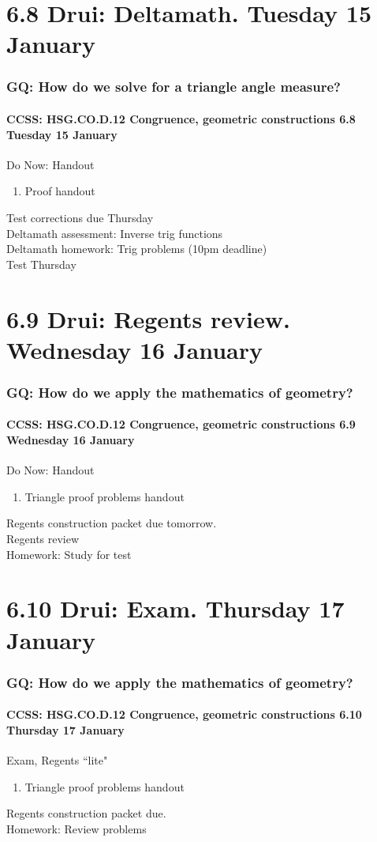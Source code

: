 \documentclass{beamer}
\begin{document}
\section{6.8 Drui: Deltamath. Tuesday 15 January}
  \frame
  {
    \frametitle{GQ: How do we solve for a triangle angle measure?}
    \framesubtitle{CCSS: HSG.CO.D.12 Congruence, geometric constructions  \alert{6.8 Tuesday 15 January}}

    \begin{block}{Do Now: Handout}
      \begin{enumerate}
        \item Proof handout
      \end{enumerate}
    \end{block}
    Test corrections due Thursday\\
    Deltamath assessment: Inverse trig functions\\
    Deltamath homework: Trig problems (10pm deadline)\\
    Test Thursday
  }

\section{6.9 Drui: Regents review. Wednesday 16 January}
  \frame
  {
    \frametitle{GQ: How do we apply the mathematics of geometry?}
    \framesubtitle{CCSS: HSG.CO.D.12 Congruence, geometric constructions  \alert{6.9 Wednesday 16 January}}

    \begin{block}{Do Now: Handout}
      \begin{enumerate}
        \item Triangle proof problems handout
      \end{enumerate}
    \end{block}
    Regents construction packet due tomorrow.\\
    Regents review\\[0.5cm]
    Homework: Study for test
  }

\section{6.10 Drui: Exam. Thursday 17 January}
  \frame
  {
    \frametitle{GQ: How do we apply the mathematics of geometry?}
    \framesubtitle{CCSS: HSG.CO.D.12 Congruence, geometric constructions  \alert{6.10 Thursday 17 January}}

    \begin{block}{Exam, Regents ``lite"}
      \begin{enumerate}
        \item Triangle proof problems handout
      \end{enumerate}
    \end{block}
    Regents construction packet due.\\[0.5cm]
    Homework: Review problems
  }
\end{document}
